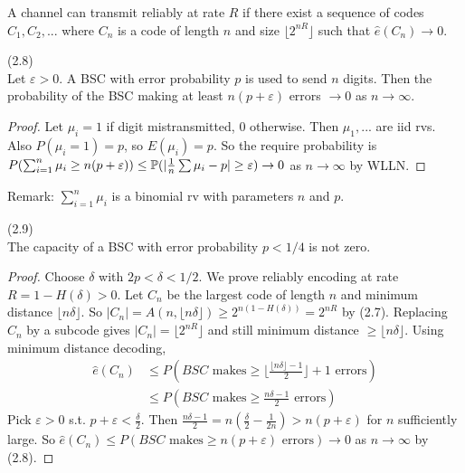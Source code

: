 \documentclass[a4paper]{article}
\begin{document}
\begin{defi}
A channel can transmit reliably at rate $R$ if there exist a sequence of codes $C_1,C_2,...$ where $C_n$ is a code of length $n$ and size $\lfloor 2^{nR}\rfloor$ such that $\hat{e}(C_n) \to 0$.
\end{defi}

\begin{lemma} (2.8)\\
Let $\varepsilon>0$. A BSC with error probability $p$ is used to send $n$ digits. Then the probability of the BSC making at least $n(p+\varepsilon)$ errors $\to 0$ as $n \to \infty$.
\begin{proof}
Let $\mu_i = 1$ if digit mistransmitted, $0$ otherwise. Then $\mu_1,...$ are iid rvs. Also $P(\mu_i=1) = p$, so $E(\mu_i) = p$. So the require probability is $P(\sum_{i=1}^n \mu_i \geq n(p+\varepsilon)) \leq \P(|\frac{1}{n} \sum \mu_i-p| \geq \varepsilon) \to 0$ as $n \to \infty$ by WLLN.
\end{proof}
\end{lemma}

Remark: $\sum_{i=1}^n \mu_i$ is a binomial rv with parameters $n$ and $p$.

\begin{prop} (2.9)\\
The capacity of a BSC with error probability $p<1/4$ is not zero.
\begin{proof}
Choose $\delta$ with $2p < \delta < 1/2$. We prove reliably encoding at rate $R=1-H(\delta)>0$. Let $C_n$ be the largest code of length $n$ and minimum distance $\lfloor n\delta\rfloor$. So $|C_n| = A(n,\lfloor n\delta\rfloor) \geq 2^{n(1-H(\delta))} = 2^{nR}$ by (2.7). Replacing $C_n$ by a subcode gives $|C_n| = \lfloor 2^{nR}\rfloor$ and still minimum distance $\geq \lfloor n\delta\rfloor$. Using minimum distance decoding,
\begin{equation*}
\begin{aligned}
\hat{e}(C_n) &\leq P(BSC \text{ makes} \geq \lfloor \frac{\lfloor n\delta\rfloor-1}{2}\rfloor+1 \text{ errors} )\\
&\leq P(BSC \text{ makes} \geq \frac{n\delta-1}{2} \text{ errors})
\end{aligned}
\end{equation*}
Pick $\varepsilon > 0$ s.t. $p+\varepsilon < \frac{\delta}{2}$. Then $\frac{n\delta-1}{2} = n(\frac{\delta}{2}-\frac{1}{2n}) > n(p+\varepsilon)$ for $n$ sufficiently large. So $\hat{e}(C_n) \leq P(BSC \text{ makes} \geq n(p+\varepsilon) \text{ errors}) \to 0$ as $n \to \infty$ by (2.8).
\end{proof}
\end{prop}
\end{document}
